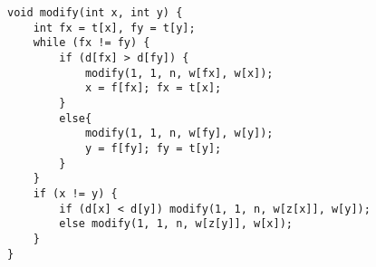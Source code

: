 \begin{lstlisting}
void modify(int x, int y) {
	int fx = t[x], fy = t[y];
	while (fx != fy) {
		if (d[fx] > d[fy]) {
			modify(1, 1, n, w[fx], w[x]);
			x = f[fx]; fx = t[x];
		}
		else{
			modify(1, 1, n, w[fy], w[y]);
			y = f[fy]; fy = t[y];
		}
	}
	if (x != y) {
		if (d[x] < d[y]) modify(1, 1, n, w[z[x]], w[y]);
		else modify(1, 1, n, w[z[y]], w[x]);
	}
}
\end{lstlisting}
